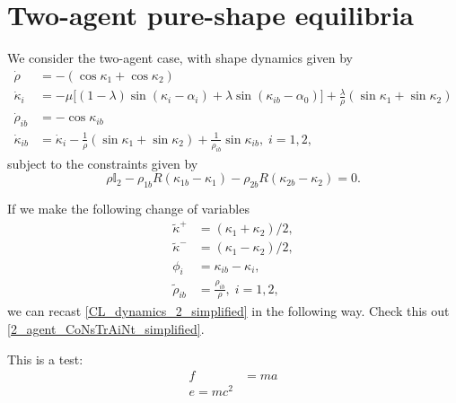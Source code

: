 \section{Two-agent pure-shape equilibria}

We consider the two-agent case, with shape dynamics given by
\begin{equation}
\begin{aligned}
\dot{\rho} &= - (\cos\kappa_1 + \cos\kappa_2) 
\\
\dot{\kappa}_i &= - \mu \Big[(1 - \lambda)\sin(\kappa_i - \alpha_i) + \lambda \sin(\kappa_{ib} - \alpha_0) \Big] + \frac{\lambda}{\rho}(\sin\kappa_1 + \sin\kappa_2) 
\\
\dot{\rho}_{ib} &= - \cos\kappa_{ib}  
\\
\dot{\kappa}_{ib} &= \dot{\kappa}_i - \frac{1}{\rho}(\sin\kappa_1 + \sin\kappa_2) + \frac{1}{\rho_{ib}} \sin\kappa_{ib},  \; i=1,2,
\end{aligned}
\label{CL_dynamics_2_simplified}
\end{equation}
subject to the constraints given by
\begin{equation}
\rho \mathbb{I}_2 - \rho_{1b} R(\kappa_{1b} - \kappa_1) - \rho_{2b} R(\kappa_{2b} - \kappa_{2}) = 0. 
\label{2_agent_CoNsTrAiNt_simplified}
\end{equation}

If we make the following change of variables
\begin{align*}
\tilde{\kappa}^+ 
&= (\kappa_1 + \kappa_2)/2,
\nonumber \\
\tilde{\kappa}^- 
&= 
(\kappa_1 - \kappa_2)/2,
\nonumber \\
\phi_{i} 
&= 
\kappa_{ib} - \kappa_i,
\nonumber \\
\tilde{\rho}_{ib} 
&= 
\frac{\rho_{ib} }{\rho}, 
\; i=1,2,
\end{align*}
we can recast \eqref{CL_dynamics_2_simplified} in the following way. Check this out \eqref{2_agent_CoNsTrAiNt_simplified}.

This is a test:
\begin{align}
f &= ma \nonumber \\
e=mc^2
\end{align}

  
  
  
  
  
  
  
  